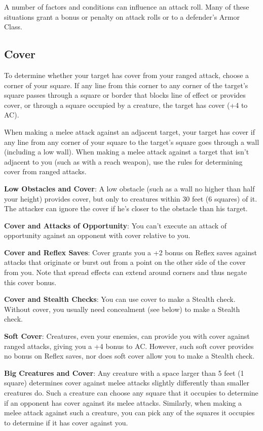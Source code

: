 				
A number of factors and conditions can influence an attack roll. Many of these situations grant a bonus or penalty on attack rolls or to a defender's Armor Class.
				
\subsection{Cover}

				
To determine whether your target has cover from your ranged attack, choose a corner of your square. If any line from this corner to any corner of the target's square passes through a square or border that blocks line of effect or provides cover, or through a square occupied by a creature, the target has cover (+4 to AC).
				
When making a melee attack against an adjacent target, your target has cover if any line from any corner of your square to the target's square goes through a wall (including a low wall). When making a melee attack against a target that isn't adjacent to you (such as with a reach weapon), use the rules for determining cover from ranged attacks.
				
\textbf{Low Obstacles and Cover}: A low obstacle (such as a wall no higher than half your height) provides cover, but only to creatures within 30 feet (6 squares) of it. The attacker can ignore the cover if he's closer to the obstacle than his target.
				
\textbf{Cover and Attacks of Opportunity}: You can't execute an attack of opportunity against an opponent with cover relative to you.
				
\textbf{Cover and Reflex Saves}: Cover grants you a +2 bonus on Reflex saves against attacks that originate or burst out from a point on the other side of the cover from you. Note that spread effects can extend around corners and thus negate this cover bonus.
				
\textbf{Cover and Stealth Checks}: You can use cover to make a Stealth check. Without cover, you usually need concealment (see below) to make a Stealth check.
				
\textbf{Soft Cover}: Creatures, even your enemies, can provide you with cover against ranged attacks, giving you a +4 bonus to AC. However, such soft cover provides no bonus on Reflex saves, nor does soft cover allow you to make a Stealth check.
				
\textbf{Big Creatures and Cover}: Any creature with a space larger than 5 feet (1 square) determines cover against melee attacks slightly differently than smaller creatures do. Such a creature can choose any square that it occupies to determine if an opponent has cover against its melee attacks. Similarly, when making a melee attack against such a creature, you can pick any of the squares it occupies to determine if it has cover against you.
				
